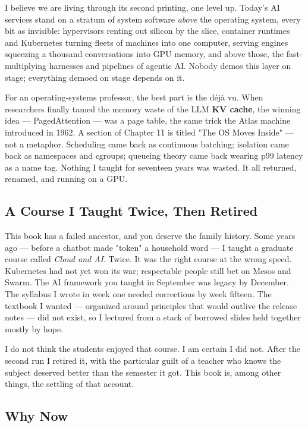 I believe we are living through its second printing, one level up. Today's AI services stand on a stratum of system software \textit{above} the operating system, every bit as invisible: hypervisors renting out silicon by the slice, container runtimes and Kubernetes turning fleets of machines into one computer, serving engines squeezing a thousand conversations into GPU memory, and above those, the fast-multiplying harnesses and pipelines of agentic AI. Nobody demos this layer on stage; everything demoed on stage depends on it.

For an operating-systems professor, the best part is the déjà vu. When researchers finally tamed the memory waste of the LLM \textbf{KV cache}, the winning idea — PagedAttention — was a page table, the same trick the Atlas machine introduced in 1962. A section of Chapter 11 is titled "The OS Moves Inside" — not a metaphor. Scheduling came back as continuous batching; isolation came back as namespaces and cgroups; queueing theory came back wearing p99 latency as a name tag. Nothing I taught for seventeen years was wasted. It all returned, renamed, and running on a GPU.

\subsection*{A Course I Taught Twice, Then Retired}

This book has a failed ancestor, and you deserve the family history. Some years ago — before a chatbot made "token" a household word — I taught a graduate course called \textit{Cloud and AI}. Twice. It was the right course at the wrong speed. Kubernetes had not yet won its war; respectable people still bet on Mesos and Swarm. The AI framework you taught in September was legacy by December. The syllabus I wrote in week one needed corrections by week fifteen. The textbook I wanted — organized around principles that would outlive the release notes — did not exist, so I lectured from a stack of borrowed slides held together mostly by hope.

I do not think the students enjoyed that course. I am certain I did not. After the second run I retired it, with the particular guilt of a teacher who knows the subject deserved better than the semester it got. This book is, among other things, the settling of that account.

\subsection*{Why Now}

